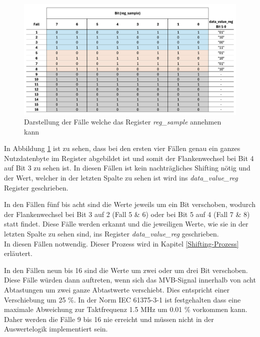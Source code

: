 \begin{figure}[H]
    \centering
    \includegraphics[width=1\linewidth]{Figures//Chap3//FPGA/FPGA_decoding_case.png}
    \caption{Darstellung der Fälle welche das Register \textit{reg\_sample} annehmen kann}
    \label{fig:FPGAreg_sampleCases}
\end{figure}

In Abbildung \ref{fig:FPGAreg_sampleCases} ist zu sehen, dass bei den ersten vier
Fällen genau ein ganzes Nutzdatenbyte im Register abgebildet ist und somit der 
Flankenwechsel bei Bit 4 auf Bit 3 zu sehen ist. In diesen Fällen ist kein 
nachträgliches Shifting nötig und der Wert, welcher in der letzten Spalte zu
sehen ist wird ins \textit{data\_value\_reg} Register geschrieben.

In den Fällen fünf bis acht sind die Werte jeweils um ein Bit verschoben, wodurch
der Flankenwechsel bei Bit 3 auf 2 (Fall 5 \& 6) oder bei Bit 5 auf 4
(Fall 7 \& 8) statt findet. Diese Fälle werden erkannt und die jeweiligen Werte, wie
sie in der letzten Spalte zu sehen sind, ins Register \textit{data\_value\_reg} 
geschrieben.\\
In diesen Fällen notwendig. Dieser Prozess wird in Kapitel \ref{Shifting-Prozess}
erläutert.

In den Fällen neun bis 16 sind die Werte um zwei oder um drei Bit verschoben. Diese Fälle würden dann auftreten, wenn sich das MVB-Signal innerhalb von acht
Abtastungen um zwei ganze Abtastwerte verschiebt. Dies entspricht einer
Verschiebung um 25 \%. In der Norm IEC 61375-3-1 ist festgehalten dass eine maximale Abweichung zur Taktfrequenz 1.5 MHz um 0.01 \% vorkommen kann. \cite{MVB_Norm}\\
Daher werden die Fälle 9 bis 16 nie erreicht und müssen nicht in der Auswertelogik
implementiert sein.
 

